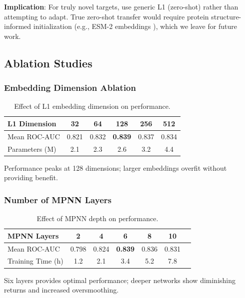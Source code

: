 \documentclass[sigconf,anonymous]{acmart}
\begin{document}
\textbf{Implication}: For truly novel targets, use generic L1 (zero-shot) rather than attempting to adapt. True zero-shot transfer would require protein structure-informed initialization (e.g., ESM-2 embeddings \cite{lin_2023_esm2}), which we leave for future work.

\subsection{Ablation Studies}

\subsubsection{Embedding Dimension Ablation}

\begin{table}[t]
\caption{Effect of L1 embedding dimension on performance.}
\label{tab:dim_ablation}
\centering
\small
\begin{tabular}{@{}lccccc@{}}
\toprule
L1 Dimension & 32 & 64 & 128 & 256 & 512 \\
\midrule
Mean ROC-AUC & 0.821 & 0.832 & \textbf{0.839} & 0.837 & 0.834 \\
Parameters (M) & 2.1 & 2.3 & 2.6 & 3.2 & 4.4 \\
\bottomrule
\end{tabular}
\end{table}

Performance peaks at 128 dimensions; larger embeddings overfit without providing benefit.

\subsubsection{Number of MPNN Layers}

\begin{table}[t]
\caption{Effect of MPNN depth on performance.}
\label{tab:depth_ablation}
\centering
\small
\begin{tabular}{@{}lcccccc@{}}
\toprule
MPNN Layers & 2 & 4 & 6 & 8 & 10 \\
\midrule
Mean ROC-AUC & 0.798 & 0.824 & \textbf{0.839} & 0.836 & 0.831 \\
Training Time (h) & 1.2 & 2.1 & 3.4 & 5.2 & 7.8 \\
\bottomrule
\end{tabular}
\end{table}

Six layers provides optimal performance; deeper networks show diminishing returns and increased oversmoothing.
\end{document}

